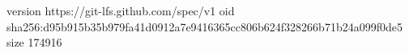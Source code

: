 version https://git-lfs.github.com/spec/v1
oid sha256:d95b915b35b979fa41d0912a7e9416365cc806b624f328266b71b24a099f0de5
size 174916
